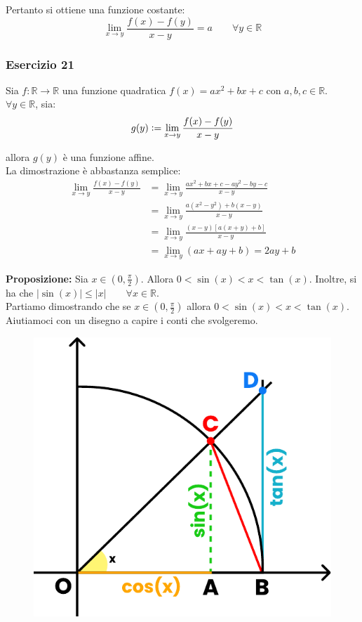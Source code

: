 \documentclass{article}
\begin{document}
\noindent Pertanto si ottiene una funzione costante: 
\begin{equation*}
    \lim_{x \to y} \frac{f(x) - f(y)}{x - y} = a \qquad \forall y \in \mathbb{R}
\end{equation*}

\subsubsection{Esercizio 21}
Sia $f: \mathbb{R} \xrightarrow{} \mathbb{R}$ una funzione quadratica $f(x) = ax^2 + bx + c$ con $a, b, c \in \mathbb{R}$.\\
$\forall y \in \mathbb{R}$, sia:
\begin{equation*}
    g(y) \vcentcolon = \lim_{x \to y} \frac{f(x) - f(y)}{x - y}
\end{equation*}

\noindent allora $g(y)$ è una funzione affine.\\

\noindent La dimostrazione è abbastanza semplice:
\begin{align*}
    \lim_{x \to y} \frac{f(x) - f(y)}{x - y} &= \lim_{x \to y} \frac{ax^2 + bx + c - ay^2 - by - c}{x - y} \\
    &= \lim_{x \to y} \frac{a(x^2 - y^2) + b(x - y)}{x - y} \\
    &= \lim_{x \to y} \frac{(x - y)[a(x + y) + b]}{x - y} \\
    &= \lim_{x \to y} (ax + ay + b) = 2ay + b
\end{align*}

\noindent\textbf{Proposizione:} Sia $x \in (0, \frac{\pi}{2})$. Allora $0 < \sin(x) < x < \tan(x)$. Inoltre, si ha che $|\sin(x)| \leq |x| \qquad \forall x \in \mathbb{R}$.\\

\noindent Partiamo dimostrando che se $x \in (0, \frac{\pi}{2})$ allora $0 < \sin(x) < x < \tan(x)$. Aiutiamoci con un disegno a capire i conti che svolgeremo.

\begin{figure}
\includegraphics[width=0.9\linewidth]{./images/proposition.pdf}
\end{figure}
\end{document}
